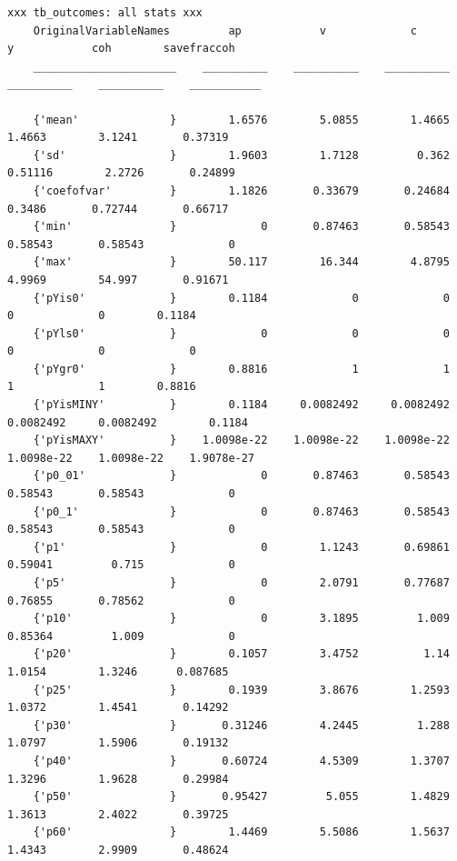 \documentclass[
]{book}
\begin{document}
\begin{verbatim}
xxx tb_outcomes: all stats xxx
    OriginalVariableNames         ap            v             c             y            coh        savefraccoh
    ______________________    __________    __________    __________    __________    __________    ___________

    {'mean'              }        1.6576        5.0855        1.4665        1.4663        3.1241       0.37319 
    {'sd'                }        1.9603        1.7128         0.362       0.51116        2.2726       0.24899 
    {'coefofvar'         }        1.1826       0.33679       0.24684        0.3486       0.72744       0.66717 
    {'min'               }             0       0.87463       0.58543       0.58543       0.58543             0 
    {'max'               }        50.117        16.344        4.8795        4.9969        54.997       0.91671 
    {'pYis0'             }        0.1184             0             0             0             0        0.1184 
    {'pYls0'             }             0             0             0             0             0             0 
    {'pYgr0'             }        0.8816             1             1             1             1        0.8816 
    {'pYisMINY'          }        0.1184     0.0082492     0.0082492     0.0082492     0.0082492        0.1184 
    {'pYisMAXY'          }    1.0098e-22    1.0098e-22    1.0098e-22    1.0098e-22    1.0098e-22    1.9078e-27 
    {'p0_01'             }             0       0.87463       0.58543       0.58543       0.58543             0 
    {'p0_1'              }             0       0.87463       0.58543       0.58543       0.58543             0 
    {'p1'                }             0        1.1243       0.69861       0.59041         0.715             0 
    {'p5'                }             0        2.0791       0.77687       0.76855       0.78562             0 
    {'p10'               }             0        3.1895         1.009       0.85364         1.009             0 
    {'p20'               }        0.1057        3.4752          1.14        1.0154        1.3246      0.087685 
    {'p25'               }        0.1939        3.8676        1.2593        1.0372        1.4541       0.14292 
    {'p30'               }       0.31246        4.2445         1.288        1.0797        1.5906       0.19132 
    {'p40'               }       0.60724        4.5309        1.3707        1.3296        1.9628       0.29984 
    {'p50'               }       0.95427         5.055        1.4829        1.3613        2.4022       0.39725 
    {'p60'               }        1.4469        5.5086        1.5637        1.4343        2.9909       0.48624 

\end{verbatim}
\end{document}

